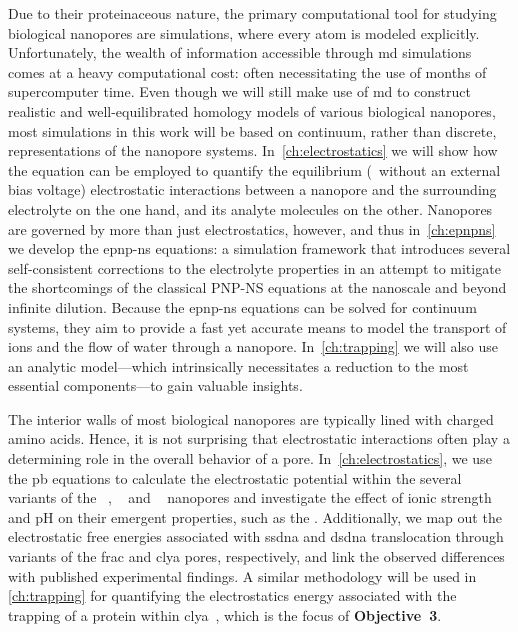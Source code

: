 Due to their proteinaceous nature, the primary computational tool for studying biological nanopores are
 simulations, where every atom is modeled explicitly. Unfortunately, the wealth of information
accessible through \gls{md} simulations comes at a heavy computational cost: often necessitating the use of
months of supercomputer time. Even though we will still make use of \gls{md} to construct realistic and
well-equilibrated homology models of various biological nanopores, most simulations in this work will be based
on continuum, rather than discrete, representations of the nanopore systems. In~\cref{ch:electrostatics} we will
show how the  equation can be employed to quantify the equilibrium (\ie~without an external bias
voltage) electrostatic interactions between a nanopore and the surrounding electrolyte on the one hand, and
its analyte molecules on the other. Nanopores are governed by more than just electrostatics, however, and thus
in~\cref{ch:epnpns} we develop the \gls{epnp-ns} equations: a simulation framework that introduces several
self-consistent corrections to the electrolyte properties in an attempt to mitigate the shortcomings of the
classical {PNP-NS} equations at the nanoscale and beyond infinite dilution. Because the \gls{epnp-ns}
equations can be solved for continuum systems, they aim to provide a fast yet accurate means to model the
transport of ions and the flow of water through a nanopore. In~\cref{ch:trapping} we will also use an analytic
model---which intrinsically necessitates a reduction to the most essential components---to gain valuable
insights.

%
%

The interior walls of most biological nanopores are typically lined with charged amino acids. Hence, it is
not surprising that electrostatic interactions often play a determining role in the overall behavior of a pore.
In~\cref{ch:electrostatics}, we use the \gls{pb} equations to calculate the electrostatic potential within the
several variants of the ~\cite{Huang-2020}, ~\cite{Wloka-2016,Huang-2017} and
~\cite{Franceschini-2016} nanopores and investigate the effect of ionic strength and pH on
their emergent properties, such as the . Additionally, we map out the electrostatic free
energies associated with \gls{ssdna} and \gls{dsdna} translocation through variants of the \gls{frac} and
\gls{clya} pores, respectively, and link the observed differences with published experimental findings. A
similar methodology will be used in \cref{ch:trapping} for quantifying the electrostatics energy associated
with the trapping of a protein within \gls{clya}~\cite{Soskine-Biesemans-2015}, which is the focus of
\textbf{Objective~3}.

